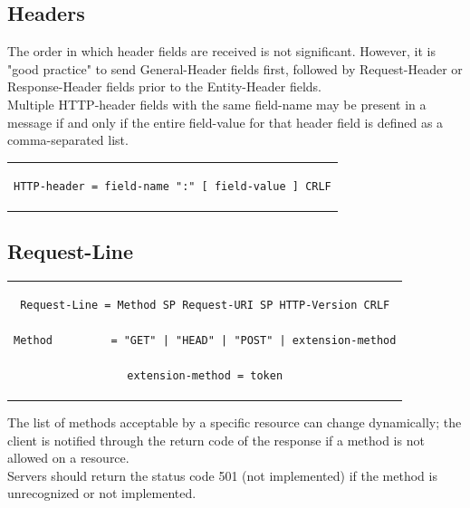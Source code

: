 \subsection{Headers}
The order in which header fields are received is not significant. However, it is "good practice" to send General-Header fields first, followed by Request-Header or Response-Header fields prior to the Entity-Header fields.\\
Multiple HTTP-header fields with the same field-name may be present in a message if and only if the entire field-value for that header field is defined as a comma-separated list.
\begin{center}
\begin{tabular}{c}
\begin{lstlisting}[linewidth=260pt, basicstyle=\footnotesize\sffamily,]
HTTP-header = field-name ":" [ field-value ] CRLF
\end{lstlisting}
\end{tabular}
\end{center}

\subsection{Request-Line}
\begin{center}
\begin{tabular}{c}
\begin{lstlisting}[linewidth=320pt, basicstyle=\footnotesize\sffamily,]
Request-Line = Method SP Request-URI SP HTTP-Version CRLF

Method         = "GET" | "HEAD" | "POST" | extension-method

extension-method = token
\end{lstlisting}
\end{tabular}
\end{center}
The list of methods acceptable by a specific resource can change dynamically; the client is notified through the return code of the response if a method is not allowed on a resource.\\
Servers should return the status code 501 (not implemented) if the method is unrecognized or not implemented.

